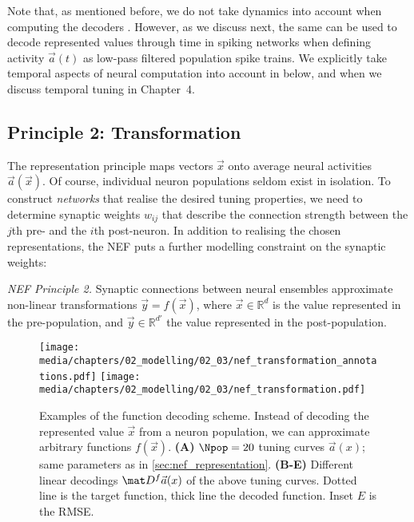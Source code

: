 Note that, as mentioned before, we do not take dynamics into account when computing the decoders \Dec.
However, as we discuss next, the same \Dec can be used to decode represented values through time in spiking networks when defining activity $\vec a(t)$ as low-pass filtered population spike trains.
We explicitly take temporal aspects of neural computation into account in  below, and when we discuss temporal tuning in Chapter~4.

\pagebreak

\subsection{Principle 2: Transformation}
\label{sec:nef_transformation}

The representation principle maps vectors $\vec x$ onto average neural activities $\vec a(\vec x)$.
Of course, individual neuron populations seldom exist in isolation.
To construct \emph{networks} that realise the desired tuning properties, we need to determine synaptic weights $w_{ij}$ that describe the connection strength between the $j$th pre- and the $i$th post-neuron.
In addition to realising the chosen representations, the NEF puts a further modelling constraint on the synaptic weights:
\begin{framed}
\noindent\emph{NEF Principle 2.} Synaptic connections between neural ensembles approximate non-linear transformations $\vec y = f(\vec x)$, where $\vec x \in \mathbb{R}^d$ is the value represented in the pre-population, and $\vec y \in \mathbb{R}^{d'}$ the value represented in the post-population.
\end{framed}

\begin{figure}
	\centering
	\texttt{[image: media/chapters/02\_modelling/02\_03/nef\_transformation\_annotations.pdf]}%
	\kern-157.19mm\texttt{[image: media/chapters/02\_modelling/02\_03/nef\_transformation.pdf]}
	\caption[Examples of the function decoding scheme.]{Examples of the function decoding scheme. Instead of decoding the represented value $\vec x$ from a neuron population, we can approximate arbitrary functions $f(\vec x)$.
	\textbf{(A)} $\Npop = 20$ tuning curves $\vec a(x)$; same parameters as in \cref{sec:nef_representation}. \textbf{(B-E)} Different linear decodings $\mat D^f \vec a(x)$ of the above tuning curves. Dotted line is the target function, thick line the decoded function. Inset $E$ is the RMSE.
	}
	\label{fig:nef_transformation}
\end{figure}


